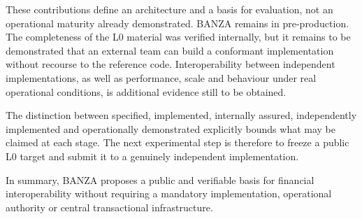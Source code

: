 \documentclass[journal abbreviation, manuscript]{copernicus}
\begin{document}
These contributions define an architecture and a basis for evaluation, not an operational maturity already demonstrated. BANZA remains in pre-production. The completeness of the L0 material was verified internally, but it remains to be demonstrated that an external team can build a conformant implementation without recourse to the reference code. Interoperability between independent implementations, as well as performance, scale and behaviour under real operational conditions, is additional evidence still to be obtained.

The distinction between specified, implemented, internally assured, independently implemented and operationally demonstrated explicitly bounds what may be claimed at each stage. The next experimental step is therefore to freeze a public L0 target and submit it to a genuinely independent implementation.

In summary, BANZA proposes a public and verifiable basis for financial interoperability without requiring a mandatory implementation, operational authority or central transactional infrastructure.


\newpage
\end{document}
